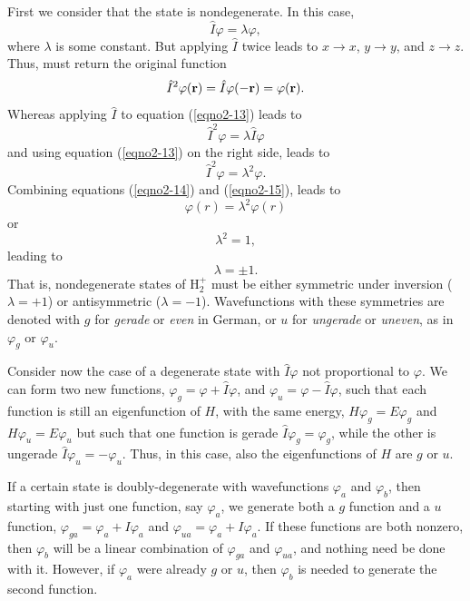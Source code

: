 First we consider that the state is nondegenerate. In this case,
\begin{equation}
{\hat I} \varphi = \lambda \varphi,
\label{eqno2-13}
\end{equation}
where $\lambda$ is some constant. But applying ${\hat I}$ twice leads 
to $x \rightarrow x$, $y \rightarrow y$, and $z \rightarrow z$. Thus,
must return the original function
\begin{equation}
{\hat I}^2 \varphi ( {\bf r} ) = {\hat I} \varphi ( - {\bf r} ) = 
\varphi ( {\bf r} ).
\label{eqno2-14}
\end{equation}
Whereas applying ${\hat I}$ to equation (\ref{eqno2-13}) leads to
\begin{equation}
{\hat I}^2 \varphi = \lambda {\hat I} \varphi
\end{equation}
and using equation (\ref{eqno2-13}) on the right side, leads to
\begin{equation}
{\hat I}^2 \varphi = \lambda^2 \varphi.
\label{eqno2-15}
\end{equation}
Combining equations (\ref{eqno2-14}) and (\ref{eqno2-15}), leads to
\begin{equation}
\varphi ( r ) = \lambda^2 \varphi (r)
\end{equation}
or 
\begin{equation}
\lambda^2 = 1,
\end{equation}
leading to 
\begin{equation}
\lambda = \pm 1.
\end{equation}
That is, nondegenerate states of H$^+_2$ must be either symmetric
under inversion ($\lambda = + 1$) or antisymmetric ($\lambda = -1$).
Wavefunctions with these symmetries are denoted with $g$ for
\emph{gerade} or \emph{even} in German, or $u$ for \emph{ungerade} or
\emph{uneven}, as in $\varphi_g$ or $\varphi_u$.

Consider now the case of a degenerate state with ${\hat I} \varphi$
not proportional to $\varphi$.  We can form two new functions,
$\varphi_g = \varphi + {\hat I} \varphi$, and $\varphi_u = \varphi -
{\hat I} \varphi$, such that each function is still an eigenfunction
of $H$, with the same energy, $H \varphi_g = E \varphi_g$ and $H
\varphi_u = E \varphi_u$ but such that one function is gerade ${\hat
I} \varphi_g = \varphi_g$, while the other is ungerade ${\hat I}
\varphi_u = - \varphi_u$.  Thus, in this case, also the eigenfunctions
of $H$ are $g$ or $u$.
 
If a certain state is doubly-degenerate with wavefunctions 
$\varphi_a$ and $\varphi_b$, then
starting with just one function, say $\varphi_a$, we generate both a $g$ 
function and a $u$ function, $\varphi_{ga} = \varphi_a + I \varphi_a$ 
and  $\varphi_{ua} = \varphi_a + I \varphi_a$.  If these functions
are both nonzero, then $\varphi_b$ will be a linear
combination of $\varphi_{ga}$ and $\varphi_{ua}$, and
nothing need be done with it.    However, if $\varphi_a$ were already 
$g$ or $u$, then $\varphi_b$ is needed to generate the second function.
    
